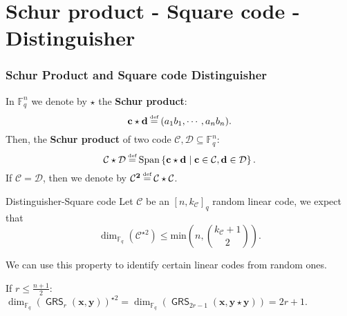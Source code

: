 \documentclass[
10pt, %
%
aspectratio=169, %
]{beamer}
\theoremstyle{plain}%
\theoremstyle{definition}
\theoremstyle{remark}
\newcommand{\calC}{\mathcal{C}}
\newcommand{\calD}{\mathcal{D}}
\newcommand{\fqm}{\mathbb{F}_{q^m}}
\newcommand{\fq}{\mathbb{F}_{q}}
\newcommand{\Span}[1]{\operatorname{Span}\left\lbrace #1\right\rbrace }
\newcommand{\GRS}{\operatorname{\mathsf{GRS}}}
\newcommand\myeq{\mathrel{\stackrel{\makebox[0pt]{\mbox{\normalfont\tiny def}}}{=}}}
\begin{document}
\section{Schur product - Square code - Distinguisher}
\begin{frame}
	\frametitle{Schur Product and Square code Distinguisher}
	In $\fq^n$ we denote by $\star$ the \textbf{Schur product}:
	\[ \mathbf{c} \star \mathbf{d} \myeq (a_1b_1,\cdots,a_nb_n). \]
	Then, the \textbf{Schur product} of two code $\calC, \calD \subseteq \fq^n$:
	\[ \mathbf{\calC } \star \mathbf{\calD }\myeq \Span{\mathbf{c} \star \mathbf{d} \mid \mathbf{c} \in \calC, \mathbf{d} \in \calD}. \]
	If $\calC = \calD$, then we denote by $\mathbf{\calC^2 \myeq \calC \star \calC} $.
	\begin{alertblock}{Distinguisher-Square code}
		Let $\calC$ be an $[n, k_{\calC}]_q$ random linear code, we expect that
		\[\displaystyle \dim_{\mathbb{F}_{q}}(\calC^{\star2}) \leq \mathrm{min}\left(n,\binom{k_{\calC}+1}{2}\right).\]
	\end{alertblock}
	We can use this property to identify certain linear codes from random ones.
	\begin{tcolorbox}[colback=aliceblue]
		 If $r \leq \frac{n+1}{2}$:
		$\dim_{\fq}(\GRS_r(\mathbf{x},\mathbf{y}))^{\star 2}=\dim_{\fq}(\GRS_{2r-1}(\mathbf{x},\mathbf{y\star y}))= 2r+1.$
	\end{tcolorbox}
\end{frame}
\end{document}
